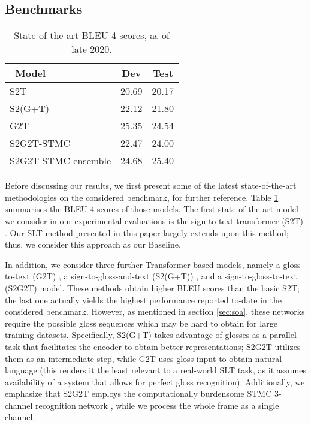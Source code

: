 \documentclass[10pt,twocolumn,letterpaper]{article}
\begin{document}
\subsection{Benchmarks}
\begin{table}[h]
\caption{State-of-the-art BLEU-4 scores, as of late 2020.}
\begin{center}
\begin{tabular}{|l||c|c|}
\hline
\ Model & Dev & Test  \\ 
\hline\hline
S2T  \cite{Camgoz20}          & 20.69    & 20.17         \\ 
S2(G+T) \cite{Camgoz20}   & 22.12   & 21.80         \\ 
\hline
G2T \cite{Camgoz20}          & 25.35    & 24.54         \\ 
\hline
S2G2T-STMC \cite{yin2020}        & 22.47   &  24.00   \\ 
S2G2T-STMC ensemble \cite{yin2020}   &  24.68   &  25.40     \\ 
\hline
\end{tabular}
\label{tab:benchmark}
\end{center}
\end{table}
Before discussing our results,  we first present some of the latest state-of-the-art methodologies on the considered benchmark, for further reference.  Table \ref{tab:benchmark} summarises the BLEU-4 scores of those models. The first state-of-the-art  model  we  consider  in our  experimental evaluations  is  the  sign-to-text transformer  (S2T)  \cite{Camgoz20}.   Our  SLT  method presented in this paper largely extends upon  this method; thus, we consider this approach as our Baseline.

In addition, we consider three further Transformer-based models, namely  a gloss-to-text (G2T) \cite{Camgoz20}, a sign-to-gloss-and-text (S2(G+T)) \cite{Camgoz20}, and a sign-to-gloss-to-text (S2G2T) \cite{yin2020} model. These methods obtain higher BLEU scores than the basic S2T; the last one actually yields the highest performance reported to-date in the considered benchmark. However, as mentioned in section \ref{sec:soa}, these networks require the possible gloss sequences which may be hard to obtain for large training datasets. Specifically, S2(G+T) takes advantage of glosses as a parallel task that facilitates the encoder to obtain better representations; S2G2T utilizes them as an intermediate step, while G2T uses gloss input to obtain natural language (this renders it the least relevant to a real-world SLT task, as it assumes availability of a system that allows for perfect gloss recognition). Additionally, we emphasize that S2G2T employs the computationally burdensome STMC 3-channel recognition network \cite{ZhouZZL20}, while we process the whole frame as a single channel.
\end{document}
